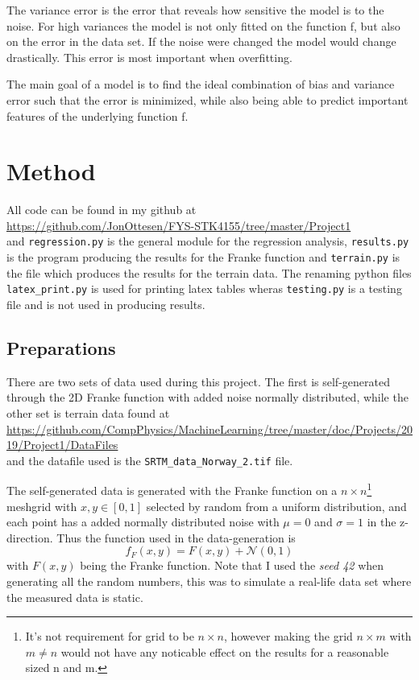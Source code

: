 \documentclass[uio,jmp,amsmath,amssymb,reprint,nofootinbib]{revtex4-1}
\numberwithin{equation}{section}
\begin{document}
The variance error is the error that reveals how sensitive the model is to the noise. For high variances the model is not only fitted on the function f, but also on the error in the data set. If the noise were changed the model would change drastically. This error is most important when overfitting.

The main goal of a model is to find the ideal combination of bias and variance error such that the error is minimized, while also being able to predict important features of the underlying function f.

\section{Method}\label{sec:Method}

All code can be found in my github at\\
\url{https://github.com/JonOttesen/FYS-STK4155/tree/master/Project1}\\
and \texttt{regression.py} is the general module for the regression analysis, \texttt{results.py} is the program producing the results for the Franke function and \texttt{terrain.py} is the file which produces the results for the terrain data. The renaming python files \texttt{latex\_print.py} is used for printing latex tables wheras \texttt{testing.py} is a testing file and is not used in producing results.

\subsection{Preparations}

There are two sets of data used during this project. The first is self-generated through the 2D Franke function with added noise normally distributed, while the other set is terrain data found at\\
\url{https://github.com/CompPhysics/MachineLearning/tree/master/doc/Projects/2019/Project1/DataFiles}\\
and the datafile used is the \texttt{SRTM\_data\_Norway\_2.tif} file.

The self-generated data is generated with the Franke function on a \(n\times n\)\footnote{It's not requirement for grid to be \(n\times n\), however making the grid \(n\times m\) with \(m\neq n\) would not have any noticable effect on the results for a reasonable sized n and m.} meshgrid with \(x,y\in [0,1]\) selected by random from a uniform distribution, and each point has a added normally distributed noise with \(\mu = 0\) and \(\sigma = 1\) in the z-direction. Thus the function used in the data-generation is
\begin{equation}
f_{F}(x,y) = F(x, y) + \mathcal{N}(0,1)
\end{equation}
with \(F(x,y)\) being the Franke function. Note that I used the \textit{seed 42} when generating all the random numbers, this was to simulate a real-life data set where the measured data is static.
\end{document}
